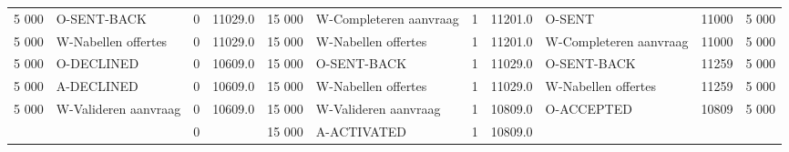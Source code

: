 \begin{tabular}{rlrlrlrllll}
5 000 & O-SENT-BACK & 0 & 11029.0 & 15 000 & W-Completeren aanvraag & 1 & 11201.0 & O-SENT & 11000 & 5 000 \\
5 000 & W-Nabellen offertes & 0 & 11029.0 & 15 000 & W-Nabellen offertes & 1 & 11201.0 & W-Completeren aanvraag & 11000 & 5 000 \\
5 000 & O-DECLINED & 0 & 10609.0 & 15 000 & O-SENT-BACK & 1 & 11029.0 & O-SENT-BACK & 11259 & 5 000 \\
5 000 & A-DECLINED & 0 & 10609.0 & 15 000 & W-Nabellen offertes & 1 & 11029.0 & W-Nabellen offertes & 11259 & 5 000 \\
5 000 & W-Valideren aanvraag & 0 & 10609.0 & 15 000 & W-Valideren aanvraag & 1 & 10809.0 & O-ACCEPTED & 10809 & 5 000 \\
 &  & 0 &  & 15 000 & A-ACTIVATED & 1 & 10809.0 &  &  &  \\
\bottomrule
\end{tabular}

